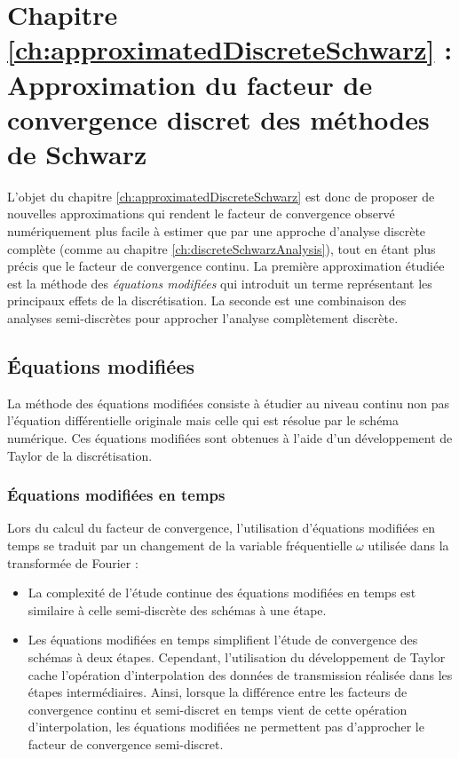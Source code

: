 \section*{Chapitre \ref{ch:approximatedDiscreteSchwarz} : Approximation du facteur de convergence discret des méthodes de Schwarz}
L'objet du chapitre \ref{ch:approximatedDiscreteSchwarz} est donc
de proposer de nouvelles approximations qui rendent le
facteur de convergence observé numériquement plus facile à estimer
que par une approche d'analyse discrète complète (comme au chapitre
\ref{ch:discreteSchwarzAnalysis}), tout en étant plus précis que le
facteur de convergence continu.
La première approximation étudiée est la méthode des
\textit{équations modifiées} qui introduit un terme représentant
les principaux effets de la discrétisation.
La seconde est une combinaison des analyses semi-discrètes
pour approcher l'analyse complètement discrète.
\subsection*{Équations modifiées}
La méthode des équations modifiées consiste à étudier au niveau
continu non pas l'équation différentielle originale mais celle
qui est résolue par le schéma numérique.
Ces équations modifiées sont obtenues à l'aide d'un développement
de Taylor de la discrétisation.
\subsubsection*{Équations modifiées en temps}
Lors du calcul du facteur de convergence, l'utilisation d'équations
modifiées en temps se traduit par un changement de la variable
fréquentielle $\omega$ utilisée dans la transformée de Fourier :
\begin{itemize}
	\item
La complexité de l'étude continue des équations modifiées en temps
est similaire à celle semi-discrète des schémas à une étape.
	\item
Les équations modifiées en temps simplifient l'étude de convergence
des schémas à deux étapes. Cependant, l'utilisation du développement
de Taylor cache l'opération d'interpolation des données de
transmission réalisée dans les étapes intermédiaires. Ainsi, lorsque la
différence entre les facteurs de convergence continu
et semi-discret en temps vient de cette opération d'interpolation,
les équations modifiées ne permettent pas d'approcher le facteur
de convergence semi-discret.
\end{itemize}
